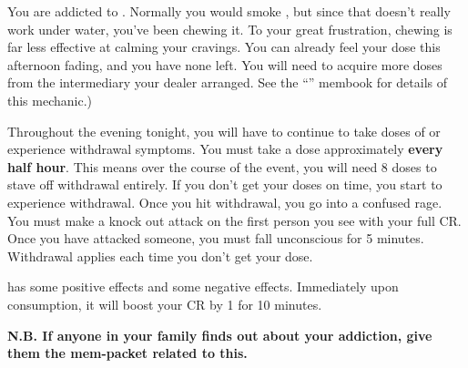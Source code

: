 \documentclass[green]{NeptuneBall}
\begin{document}
\name{\gAddicted{}}

You are addicted to \iDrug{}. Normally you would smoke \iDrug{}, but since that doesn't really work under water, you've been chewing it. To your great frustration, chewing is far less effective at calming your cravings. You can already feel your dose this afternoon fading, and you have none left. You will need to acquire more doses from the intermediary your dealer arranged. See the ``\mSpyBook{}'' membook for details of this mechanic.)

Throughout the evening tonight, you will have to continue to take doses of \iDrug{} or experience withdrawal symptoms. You must take a dose approximately \textbf{every half hour}. This means over the course of the event, you will need 8 doses to stave off withdrawal entirely. If you don't get your doses on time, you start to experience withdrawal. Once you hit withdrawal, you go into a confused rage. You must make a knock out attack on the first person you see with your full CR. Once you have attacked someone, you must fall unconscious for 5 minutes. Withdrawal applies each time you don't get your dose.


\iDrug{} has some positive effects and some negative effects. Immediately upon consumption, it will boost your CR by 1 for 10 minutes.

{\bf N.B. If anyone in your family finds out about your addiction, give them the mem-packet related to this.}
\end{document}
